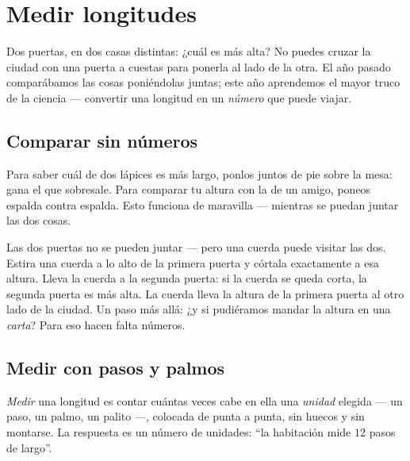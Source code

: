 \chapter{Medir longitudes}\label{ch:g2:measuring-length}

Dos puertas, en dos casas distintas: ¿cuál es más alta? No puedes
cruzar la ciudad con una puerta a cuestas para ponerla al lado de la
otra. El año pasado comparábamos las cosas poniéndolas juntas; este
año aprendemos el mayor truco de la ciencia --- convertir una longitud
en un \emph{número} que puede viajar.

\section{Comparar sin números}

\begin{example}\label{ex:g2:measuring-length:sidebyside}
Para saber cuál de dos lápices es más largo, ponlos juntos de pie
sobre la mesa: gana el que sobresale. Para comparar tu altura con la
de un amigo, poneos espalda contra espalda. Esto funciona de maravilla
--- mientras se puedan juntar las dos cosas.
\end{example}

\begin{example}\label{ex:g2:measuring-length:string}
Las dos puertas no se pueden juntar --- pero una cuerda puede visitar
las dos. Estira una cuerda a lo alto de la primera puerta y córtala
exactamente a esa altura. Lleva la cuerda a la segunda puerta: si la
cuerda se queda corta, la segunda puerta es más alta. La cuerda lleva
la altura de la primera puerta al otro lado de la ciudad. Un paso más
allá: ¿y si pudiéramos mandar la altura en una \emph{carta}? Para eso
hacen falta números.
\end{example}

\section{Medir con pasos y palmos}

\begin{definition}\label{def:g2:measuring-length:measure}
\emph{Medir} una longitud es contar cuántas veces cabe en
ella una \emph{unidad} elegida --- un paso, un palmo, un
palito ---, colocada de punta a punta, sin huecos y sin montarse. La
respuesta es un número de unidades: ``la habitación mide $12$ pasos de
largo''.
\end{definition}

